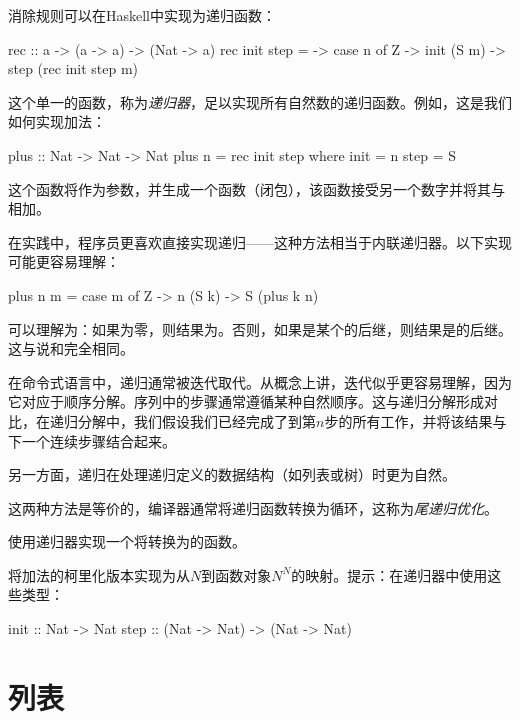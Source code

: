 \documentclass[DaoFP]{subfiles}
\begin{document}
消除规则可以在Haskell中实现为递归函数：

\begin{haskell}
rec :: a -> (a -> a) -> (Nat -> a)
rec init step = \n ->
  case n of
    Z     -> init
    (S m) -> step (rec init step m)
\end{haskell}

这个单一的函数，称为\emph{递归器}，足以实现所有自然数的递归函数。例如，这是我们如何实现加法：

\begin{haskell}
plus :: Nat -> Nat -> Nat
plus n = rec init step
  where
    init = n
    step = S
\end{haskell}
这个函数将作为参数，并生成一个函数（闭包），该函数接受另一个数字并将其与相加。

在实践中，程序员更喜欢直接实现递归——这种方法相当于内联递归器。以下实现可能更容易理解：
\begin{haskell}
plus n m = case m of
  Z -> n
  (S k) -> S (plus k n)
\end{haskell}
可以理解为：如果为零，则结果为。否则，如果是某个的后继，则结果是的后继。这与说和完全相同。

在命令式语言中，递归通常被迭代取代。从概念上讲，迭代似乎更容易理解，因为它对应于顺序分解。序列中的步骤通常遵循某种自然顺序。这与递归分解形成对比，在递归分解中，我们假设我们已经完成了到第$n$步的所有工作，并将该结果与下一个连续步骤结合起来。

另一方面，递归在处理递归定义的数据结构（如列表或树）时更为自然。

这两种方法是等价的，编译器通常将递归函数转换为循环，这称为\emph{尾递归优化}。

\begin{exercise}
使用递归器实现一个将转换为的函数。
\end{exercise}

\begin{exercise}
将加法的柯里化版本实现为从$N$到函数对象$N^N$的映射。提示：在递归器中使用这些类型：
\begin{haskell}
init :: Nat -> Nat
step :: (Nat -> Nat) -> (Nat -> Nat)
\end{haskell}

\end{exercise}

\section{列表}
\end{document}
